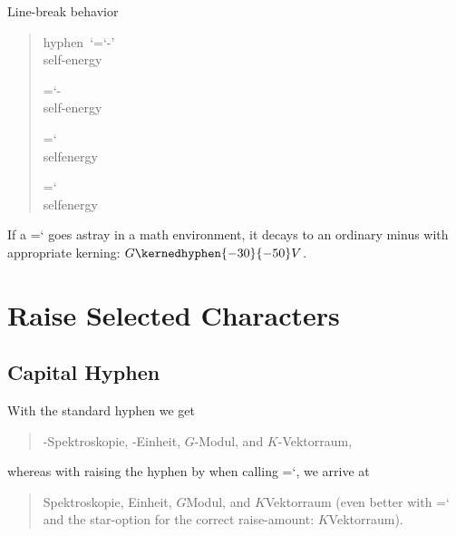 \documentclass[a4paper]{article}
\newcommand*{\acronym}[1]{\mbox{\letterspacecapitals{\MakeUppercase{#1}}}}
\newcommand*{\code}[1]{{\ttfamily\hyphenchar\font=`\-\relax #1}}
\newcommand*{\letterspacecapitals}[1]{\textls[30]{#1}}
\begin{document}
\noindent Line-break behavior

\begin{quote}
  \setlength{\overfullrule}{0pt}

  \parbox[t]{0pt}{hyphen~\mbox{`\code{-}'}  \\  self-energy}
  \hspace{80pt}
  \parbox[t]{0pt}{\code{\string\hyp}  \\  self\hyp{}energy}
  \hspace{60pt}
  \parbox[t]{0pt}{\code{\string{}}  \\  selfenergy}
  \hspace{80pt}
  \parbox[t]{0pt}{\code{\string{}}  \\  selfenergy}
\end{quote}

\noindent If a \code{\string{}} goes astray in a math environment,
it decays to an ordinary minus with appropriate kerning:
\(G \kernedhyphen{-30}{-50} V\)\!.

\section{Raise Selected Characters}

\subsection{Capital Hyphen}

\newlength{\exemplaryraisecapitalhyphen}
\setlength{\exemplaryraisecapitalhyphen}{.6667pt}
With the standard hyphen we get

\begin{quote}
  \begin{otherlanguage}{german}
    \acronym{NMR}-Spektroskopie,
    \acronym{SI}-Einheit,
    \(G\)-Modul, and
    \(K\)-Vektorraum,
  \end{otherlanguage}
\end{quote}

\noindent whereas with raising the hyphen by \the\exemplaryraisecapitalhyphen{}
when calling \code{\string\capitalhyphen}, we arrive at

\begin{quote}
  \begin{otherlanguage}{german}

    \acronym{NMR}\capitalhyphen{}Spektroskopie,
    \acronym{SI}\capitalhyphen{}Einheit,
    \(G\)\capitalhyphen{}Modul, and
    \(K\)\capitalhyphen{}Vektorraum
    (even better with \code{\string{}}
    and the star-option for the correct raise-amount:
    \(K\)Vektorraum).
  \end{otherlanguage}
\end{quote}
\end{document}
